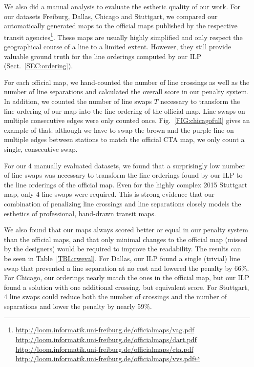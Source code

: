 \documentclass[format=acmsmall, review=false, screen=true]{acmart}
\begin{document}
We also did a manual analysis to evaluate the esthetic quality of our work. For our datasets Freiburg, Dallas, Chicago and Stuttgart, we compared our automatically generated maps to the official maps published by the respective transit agencies\footnote{\url{http://loom.informatik.uni-freiburg.de/officialmaps/vag.pdf}\\\url{http://loom.informatik.uni-freiburg.de/officialmaps/dart.pdf}\\\url{http://loom.informatik.uni-freiburg.de/officialmaps/cta.pdf}\\\url{http://loom.informatik.uni-freiburg.de/officialmaps/vvs.pdf}}. These maps are usually highly simplified and only respect the geographical course of a line to a limited extent. However, they still provide valuable ground truth for the line orderings computed by our ILP (Sect.~\ref{SEC:ordering}).

For each official map, we hand-counted the number of line crossings as well as the number of line separations and calculated the overall score in our penalty system. In addition, we counted the number of line swaps $T$ necessary to transform the line ordering of our map into the line ordering of the official map. Line swaps on multiple consecutive edges were only counted once. Fig.~\ref{FIG:chicagofull} gives an example of that: although we have to swap the brown and the purple line on multiple edges between stations to match the official CTA map, we only count a single, consecutive swap. 

For our 4 manually evaluated datasets, we found that a surprisingly low number of line swaps was necessary to transform the line orderings found by our ILP to the line orderings of the official map. Even for the highly complex 2015 Stuttgart map, only 4 line swaps were required. This is strong evidence that our combination of penalizing line crossings and line separations closely models the esthetics of professional, hand-drawn transit maps.

We also found that our maps always scored better or equal in our penalty system than the official maps, and that only minimal changes to the official map (missed by the designers) would be required to improve the readability. The results can be seen in Table~\ref{TBL:rweval}. For Dallas, our ILP found a single (trivial) line swap that prevented a line separation at no cost and lowered the penalty by 66\%. For Chicago, our orderings nearly match the ones in the official map, but our ILP found a solution with one additional crossing, but equivalent score. For Stuttgart, 4 line swaps could reduce both the number of crossings and the number of separations and lower the penalty by nearly 59\%.
\end{document}
